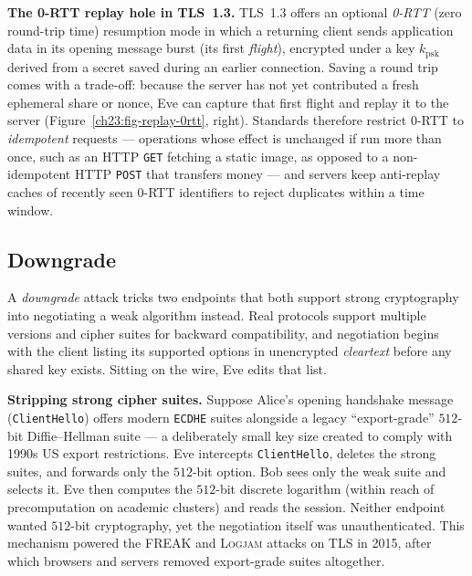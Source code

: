 \begin{trapbox}
\textbf{The 0-RTT replay hole in TLS~1.3.}
TLS~1.3 offers an optional \emph{0-RTT} (zero round-trip time) resumption mode
in which a returning client sends application data in its opening message burst
(its first \emph{flight}), encrypted under a key $k_{\mathrm{psk}}$ derived from
a secret saved during an earlier connection. Saving a round trip comes with a
trade-off: because the server has not yet contributed a fresh ephemeral share or
nonce, Eve can capture that first flight and replay it to the server
(Figure~\ref{ch23:fig-replay-0rtt}, right). Standards therefore restrict 0-RTT
to \emph{idempotent} requests --- operations whose effect is unchanged if run
more than once, such as an HTTP \texttt{GET} fetching a static image, as opposed
to a non-idempotent HTTP \texttt{POST} that transfers money --- and servers keep
anti-replay caches of recently seen 0-RTT identifiers to reject duplicates within
a time window.
\end{trapbox}

\subsection{Downgrade}

A \emph{downgrade} attack tricks two endpoints that both support strong
cryptography into negotiating a weak algorithm instead. Real protocols support
multiple versions and cipher suites for backward compatibility, and negotiation
begins with the client listing its supported options in unencrypted
\emph{cleartext} before any shared key exists. Sitting on the wire, Eve edits
that list.

\begin{attackbox}
\textbf{Stripping strong cipher suites.}
Suppose Alice's opening handshake message (\texttt{ClientHello}) offers modern
\texttt{ECDHE} suites alongside a legacy ``export-grade'' $512$-bit
Diffie--Hellman suite --- a deliberately small key size created to comply with
1990s US export restrictions. Eve intercepts \texttt{ClientHello}, deletes the
strong suites, and forwards only the $512$-bit option. Bob sees only the weak
suite and selects it. Eve then computes the $512$-bit discrete logarithm (within
reach of precomputation on academic clusters) and reads the session. Neither
endpoint wanted $512$-bit cryptography, yet the negotiation itself was
unauthenticated. This mechanism powered the \textsc{FREAK} and \textsc{Logjam}
attacks on TLS in 2015, after which browsers and servers removed export-grade
suites altogether.
\end{attackbox}

